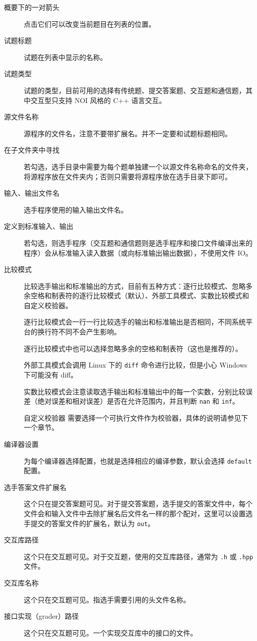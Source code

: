 \documentclass[UTF-8]{ctexart}
\begin{document}
			\begin{description}
				\item[概要下的一对箭头] 点击它们可以改变当前题目在列表的位置。
				\item[试题标题] 试题在列表中显示的名称。
				\item[试题类型] 试题的类型，目前可用的选择有传统题、提交答案题、交互题和通信题，其中交互型只支持 NOI 风格的 C++ 语言交互。
				\item[源文件名称] 源程序的文件名，注意不要带扩展名。并不一定要和试题标题相同。
				\item[在子文件夹中寻找] 若勾选，选手目录中需要为每个题单独建一个以源文件名称命名的文件夹，将源程序放在文件夹内；否则只需要将源程序放在选手目录下即可。
				\item[输入、输出文件名] 选手程序使用的输入输出文件名。
				\item[定义到标准输入、输出] 若勾选，则选手程序（交互题和通信题则是选手程序和接口文件编译出来的程序）会从标准输入读入数据（或向标准输出输出数据），不使用文件 IO。
				\item[比较模式] 比较选手输出和标准输出的方式，目前有五种方式：逐行比较模式、忽略多余空格和制表符的逐行比较模式（默认）、外部工具模式、实数比较模式和自定义校验器。
				
				逐行比较模式会一行一行比较选手的输出和标准输出是否相同，不同系统平台的换行符不同不会产生影响。
				
				逐行比较模式中也可以选择忽略多余的空格和制表符（这也是推荐的）。
				
				外部工具模式会调用 Linux 下的 \texttt{diff} 命令进行比较，但是小心 Windows 下可能没有 diff。
				
				实数比较模式会注意读取选手输出和标准输出中的每一个实数，分别比较误差（绝对误差和相对误差）是否在允许范围内，并且判断 \texttt{nan} 和 \texttt{inf}。
				
				自定义校验器 需要选择一个可执行文件作为校验器，具体的说明请参见下一个章节。
				\item[编译器设置] 为每个编译器选择配置，也就是选择相应的编译参数，默认会选择 \texttt{default} 配置。
				
				\item[选手答案文件扩展名] 这个只在提交答案题可见。对于提交答案题，选手提交的答案文件中，每个文件会和输入文件中去除扩展名后文件名一样的那个配对，这里可以设置选手提交的答案文件的扩展名，默认为 \texttt{out}。
				
				\item[交互库路径] 这个只在交互题可见。对于交互题，使用的交互库路径，通常为 \texttt{.h} 或 \texttt{.hpp} 文件。
				\item[交互库名称] 这个只在交互题可见。指选手需要引用的头文件名称。
				\item[接口实现（grader）路径] 这个只在交互题可见。一个实现交互库中的接口的文件。
				

\end{description}
\end{document}
